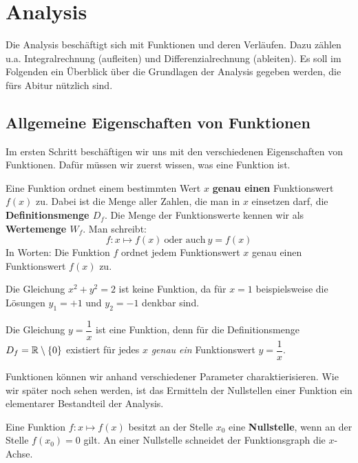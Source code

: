 \documentclass[ngerman, 12pt]{nssheetxea}
\begin{document}
\tableofcontents

\newpage

\section{Analysis}
Die Analysis beschäftigt sich mit Funktionen und deren Verläufen. Dazu zählen u.a.  Integralrechnung (\glqq aufleiten\grqq) und Differenzialrechnung (\glqq ableiten\grqq). Es soll im Folgenden ein Überblick über die Grundlagen der Analysis gegeben werden, die fürs Abitur nützlich sind.

\subsection{Allgemeine Eigenschaften von Funktionen} \label{sub:Allgemeine Eigenschaften von Funktionen}
Im ersten Schritt beschäftigen wir uns mit den verschiedenen Eigenschaften von Funktionen. Dafür müssen wir zuerst wissen, was eine Funktion ist.

\begin{definition}
Eine Funktion ordnet einem bestimmten Wert $x$ \textbf{genau einen} Funktionswert $f(x)$ zu. Dabei ist die Menge aller Zahlen, die man in $x$ einsetzen darf, die \textbf{Definitionsmenge $D_f$}. Die Menge der Funktionswerte kennen wir als \textbf{Wertemenge $W_f$}. Man schreibt:
\[ f:x \mapsto f(x) \ \text{oder auch} \ y=f(x) \]
In Worten: \glqq Die Funktion $f$ ordnet jedem Funktionswert $x$ genau einen Funktionswert $f(x)$ zu.\grqq
\label{Def:Funktion}
\end{definition}

\begin{example}
Die Gleichung $x^2+y^2=2$ ist keine Funktion, da für $x=1$ beispielsweise die Lösungen $y_1=+1$ und $y_2=-1$ denkbar sind. \par
Die Gleichung $y=\dfrac{1}{x}$ ist eine Funktion, denn für die Definitionsmenge $D_f=\mathbb{R} \setminus \{0\}$ existiert für jedes $x$ \textit{genau ein} Funktionswert $y=\dfrac{1}{x}$.
\end{example}

Funktionen können wir anhand verschiedener Parameter charaktierisieren. Wie wir später noch sehen werden, ist das Ermitteln der Nullstellen einer Funktion ein elementarer Bestandteil der Analysis.

\begin{definition}
Eine Funktion $f:x\mapsto f(x)$ besitzt an der Stelle $x_0$ eine \textbf{Nullstelle}, wenn an der Stelle $f(x_0)=0$ gilt. An einer Nullstelle schneidet der Funktionsgraph die $x$-Achse.
\end{definition}
\end{document}
